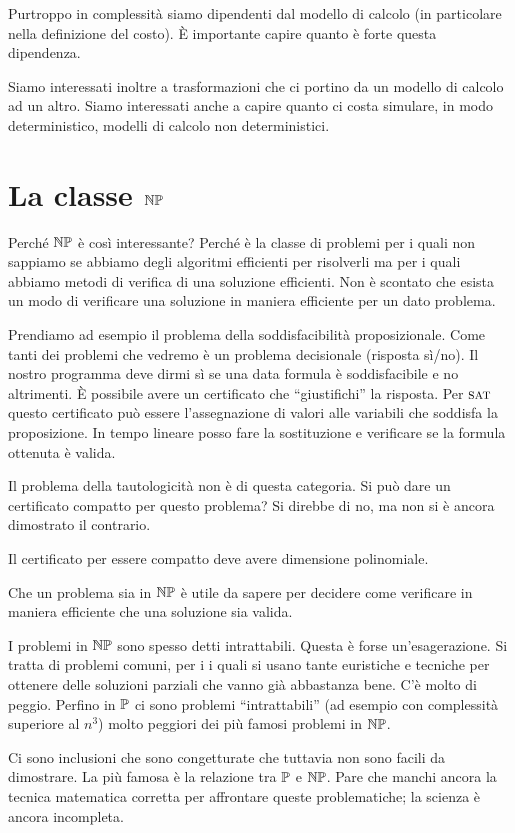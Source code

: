 Purtroppo in complessità siamo dipendenti dal modello di calcolo (in particolare nella definizione
del costo). È importante capire quanto è forte questa dipendenza.

Siamo interessati inoltre a trasformazioni che ci portino da un modello di calcolo ad un altro.
Siamo interessati anche a capire quanto ci costa simulare, in modo deterministico, modelli di
calcolo non deterministici.

\section{La classe $\mathbb{NP}$}

Perché $\mathbb{NP}$ è così interessante? Perché è la classe di problemi per i quali non sappiamo se
abbiamo degli algoritmi efficienti per risolverli ma per i quali abbiamo metodi di verifica di una
soluzione efficienti. Non è scontato che esista un modo di verificare una soluzione in maniera
efficiente per un dato problema.

Prendiamo ad esempio il problema della soddisfacibilità proposizionale. Come tanti dei problemi che
vedremo è un problema decisionale (risposta sì/no). Il nostro programma deve dirmi sì se una data
formula è soddisfacibile e no altrimenti. È possibile avere un certificato che ``giustifichi'' la
risposta. Per $\textsc{sat}$ questo certificato può essere l'assegnazione di valori alle variabili che
soddisfa la proposizione. In tempo lineare posso fare la sostituzione e verificare se la formula
ottenuta è valida.

Il problema della tautologicità non è di questa categoria. Si può dare un certificato compatto
per questo problema? Si direbbe di no, ma non si è ancora dimostrato il contrario.

Il certificato per essere compatto deve avere dimensione polinomiale.

Che un problema sia in $\mathbb{NP}$ è utile da sapere per decidere come verificare in maniera efficiente che
una soluzione sia valida.

I problemi in $\mathbb{NP}$ sono spesso detti intrattabili. Questa è forse un'esagerazione. Si tratta
di problemi comuni, per i i quali si usano tante euristiche e tecniche per ottenere delle soluzioni
parziali che vanno già abbastanza bene. C'è molto di peggio. Perfino in $\mathbb{P}$ ci sono problemi
``intrattabili'' (ad esempio con complessità superiore al $n^{3}$) molto peggiori dei più famosi
problemi in $\mathbb{NP}$.

Ci sono inclusioni che sono congetturate che tuttavia non sono facili da dimostrare. La più famosa
è la relazione tra $\mathbb{P}$ e $\mathbb{NP}$. Pare che manchi ancora la tecnica matematica corretta
per affrontare queste problematiche; la scienza è ancora incompleta.

